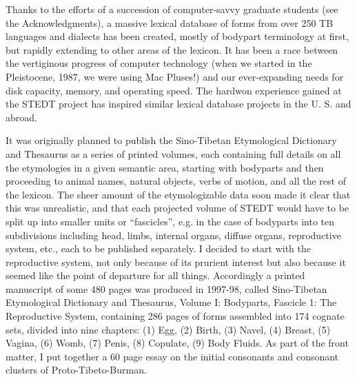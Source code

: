 Thanks to the efforts of a succession of computer-savvy graduate students (see the Acknowledgments), a massive lexical database of forms from over 250 TB languages and dialects has been created, mostly of bodypart terminology at first, but rapidly extending to other areas of the lexicon. It has been a race between the vertiginous progress of computer technology (when we started in the Pleistocene, 1987, we were using Mac Pluses!) and our ever-expanding needs for disk capacity, memory, and operating speed. The hardwon experience gained at the STEDT project has inspired similar lexical database projects in the U.
S. and abroad.

It was originally planned to publish the Sino-Tibetan Etymological Dictionary and Thesaurus as a series of printed volumes, each containing full details on all the etymologies in a given semantic area, starting with bodyparts and then proceeding to animal names, natural objects, verbs of motion, and all the rest of the lexicon. The sheer amount of the etymologizable data soon made it clear that this was unrealistic, and that each projected volume of STEDT would have to be split up into smaller units or ``fascicles'', e.g. in the case of bodyparts into ten subdivisions including head, limbs, internal organs, diffuse organs, reproductive system, etc., each to be published separately. I decided to start with the reproductive system, not only because of its prurient interest but also because it seemed like the point of departure for all things. Accordingly a printed manuscript of some 480 pages was produced in 1997-98, called Sino-Tibetan Etymological Dictionary and Thesaurus, Volume I: Bodyparts, Fascicle 1: The Reproductive System, containing 286 pages of forms assembled into 174 cognate sets, divided into nine chapters: (1) Egg, (2) Birth, (3) Navel, (4) Breast, (5) Vagina, (6) Womb, (7) Penis, (8) Copulate, (9) Body Fluids. As part of the front matter, I put together a 60 page essay on the initial consonants and consonant clusters of Proto-Tibeto-Burman.


